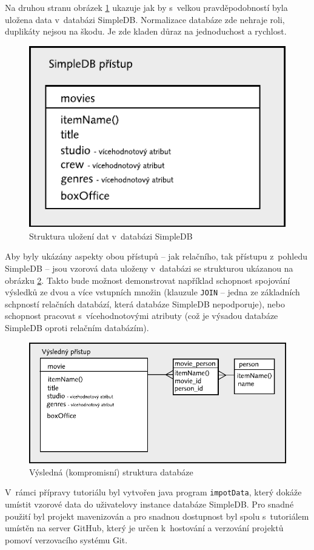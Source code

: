 \documentclass[oneside,12pt,final]{fithesis2}
\begin{document}
Na druhou stranu obrázek \ref{simpledbStructure} ukazuje jak by s~velkou pravděpodobností byla uložena data v~databázi SimpleDB. Normalizace databáze zde nehraje roli, duplikáty nejsou na škodu. Je zde kladen důraz na jednoduchost a rychlost.
\begin{figure}[h]
 \centering
 \includegraphics[scale=0.8]{simpledbStructure}
 \caption{Struktura uložení dat v~databázi SimpleDB}
 \label{simpledbStructure}
\end{figure}

Aby byly ukázány aspekty obou přístupů -- jak relačního, tak přístupu z~pohledu SimpleDB -- jsou vzorová data uloženy v~databázi se strukturou ukázanou na obrázku \ref{kompromisStructure}. Takto bude možnost demonstrovat například schopnost spojování výsledků ze dvou a více vstupních množin (klauzule \texttt{JOIN} -- jedna ze základních schpností relačních databází, která databáze SimpleDB nepodporuje), nebo schopnost pracovat s~vícehodnotovými atributy (což je výsadou databáze SimpleDB oproti relačním databázím).

\begin{figure}[h]
 \centering
 \includegraphics[scale=0.8]{kompromisStructure}
 \caption{Výsledná (kompromisní) struktura databáze}
 \label{kompromisStructure}
\end{figure}
\vspace{30mm}
V~rámci přípravy tutoriálu byl vytvořen java program \texttt{impotData}, který dokáže umístit vzorové data do uživatelovy instance databáze SimpleDB. Pro snadné použití byl projekt mavenizován a pro snadnou dostupnost byl spolu s~tutoriálem umístěn na server GitHub, který je určen k~hostování a verzování projektů pomoví verzovacího systému Git.
\end{document}
